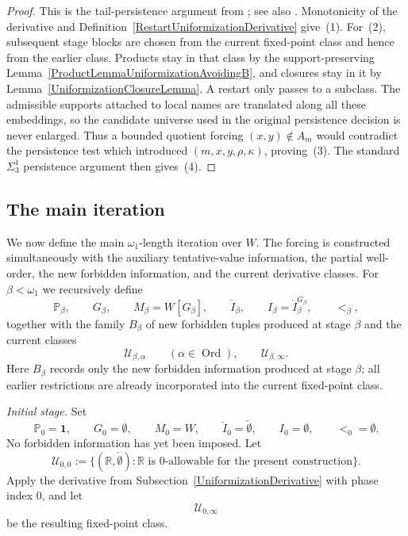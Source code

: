 \documentclass[a4paper,11pt]{article}
\newcommand{\forceP}{\mathbb{P}}
\newcommand{\forceR}{\mathbb{R}}
\begin{document}
\begin{proof}
This is the tail-persistence argument from \cite{Uniformization}; see also \cite{Uniformization with wellorder}. Monotonicity of the derivative and Definition~\ref{RestartUniformizationDerivative} give~(1). For~(2), subsequent stage blocks are chosen from the current fixed-point class and hence from the earlier class. Products stay in that class by the support-preserving Lemma~\ref{ProductLemmaUniformizationAvoidingB}, and closures stay in it by Lemma~\ref{UniformizationClosureLemma}. A restart only passes to a subclass. The admissible supports attached to local names are translated along all these embeddings, so the candidate universe used in the original persistence decision is never enlarged. Thus a bounded quotient forcing $(x,y)\notin A_m$ would contradict the persistence test which introduced $(m,x,y,\rho,\kappa)$, proving~(3). The standard $\Sigma^1_3$ persistence argument then gives~(4).
\end{proof}


\subsection{The main iteration}\label{SecondMainIteration}

We now define the main $\omega_1$-length iteration over $W$. The forcing is constructed simultaneously with the auxiliary tentative-value information, the partial well-order, the new forbidden information, and the current derivative classes. For $\beta<\omega_1$ we recursively define
\[
\forceP_\beta,\qquad G_\beta,\qquad M_\beta=W[G_\beta],\qquad
\dot I_\beta,\qquad I_\beta=\dot I_\beta^{G_\beta},\qquad <_\beta,
\]
together with the family $B_\beta$ of new forbidden tuples produced at stage $\beta$ and the current classes
\[
\mathcal U_{\beta,\alpha}\qquad(\alpha\in\operatorname{Ord}),
\qquad
\mathcal U_{\beta,\infty}.
\]
Here $B_\beta$ records only the new forbidden information produced at stage $\beta$; all earlier restrictions are already incorporated into the current fixed-point class.

\medskip
\noindent
\emph{Initial stage.}
Set
\[
\forceP_0=\mathbf 1,\qquad
G_0=\emptyset,\qquad
M_0=W,\qquad
\dot I_0=\check\emptyset,\qquad
I_0=\emptyset,\qquad
<_0=\emptyset.
\]
No forbidden information has yet been imposed. Let
\[
\mathcal U_{0,0}
:=
\{(\forceR,\check\emptyset):
\forceR\text{ is $0$-allowable for the present construction}\}.
\]
Apply the derivative from Subsection~\ref{UniformizationDerivative} with phase index $0$, and let
\[
\mathcal U_{0,\infty}
\]
be the resulting fixed-point class.
\end{document}
